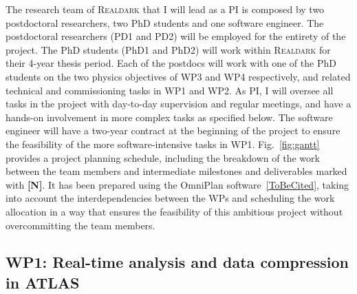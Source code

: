 
The research team of \textsc{Realdark} that I will lead as a PI is composed by two postdoctoral researchers, two PhD students and one software engineer.
The postdoctoral researchers (PD1 and PD2) will be employed for the entirety of the project. 
The PhD students (PhD1 and PhD2) will work within \textsc{Realdark} for their 4-year thesis period. 
Each of the postdocs will work with one of the PhD students on the two physics objectives of WP3 and WP4 respectively, and related technical and commissioning tasks in WP1 and WP2. 
As PI, I will oversee all tasks in the project with day-to-day supervision and regular meetings, and have a hands-on involvement in more complex tasks as specified below. 
The software engineer will have a two-year contract at the beginning of the project to ensure the feasibility of the more software-intensive tasks in WP1. 
Fig.~\ref{fig:gantt} provides a project planning schedule, including the breakdown of the work between the team members and intermediate milestones and deliverables marked with \textbf{[N]}. 
It has been prepared using the OmniPlan software~\ref{ToBeCited},%
taking into account the interdependencies between the WPs and 
scheduling the work allocation in a way that ensures the feasibility of this ambitious project without overcommitting the team members. 

\subsection{WP1: Real-time analysis and data compression in ATLAS}

